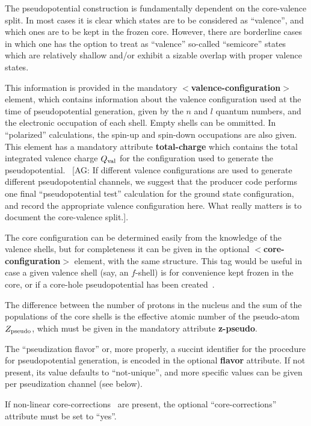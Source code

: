 \documentclass[prb,showpacs,superscriptaddress]{revtex4-1}
\def\tag#1{\textbf{$<$#1$>$}}
\def\att#1{\textbf{#1}}
\newcommand{\AG}[1]{{\color{red}~\textsf{[AG: #1]}}}
\begin{document}
The pseudopotential construction is fundamentally dependent on the
core-valence split. In most cases it is clear which states are to be
considered as ``valence'', and which ones are to be kept in the frozen
core. However, there are borderline cases in which one has the option
to treat as ``valence'' so-called ``semicore'' states which are
relatively shallow and/or exhibit a sizable overlap with proper
valence states.

This information is provided in the mandatory
\tag{valence-configuration} element, which contains information about
the valence configuration used at the time of pseudopotential
generation, given by the $n$ and $l$ quantum numbers, and the
electronic occupation of each shell.  Empty shells can be ommitted.
In ``polarized'' calculations, the spin-up and spin-down occupations
are also given.  This element has a mandatory attribute
\att{total-charge} which contains the total integrated valence
charge $Q_{\rm val}$ for the configuration used to generate the
pseudopotential.  \AG{If different valence configurations are used to
  generate different pseudopotential channels, we suggest that the
  producer code performs one final ``pseudopotential test''
  calculation for the ground state configuration, and record the
  appropriate valence configuration here. What really matters is to
  document the core-valence split.}.

The core configuration can be determined easily from the knowledge of
the valence shells, but for completeness it can be given in the
optional \tag{core-configuration} element, with the same structure.
This tag would be useful in case a given valence shell (say, an
$f$-shell) is for convenience kept frozen in the core, or if a core-hole
pseudopotential has been created~\cite{Sandra-cls-paper}.

The difference between the number of protons in the nucleus and the
sum of the populations of the core shells is the effective atomic
number of the pseudo-atom $Z_{\rm pseudo}$, which must be given in the
mandatory attribute \att{z-pseudo}.

The ``pseudization flavor'' or, more properly, a succint identifier
for the procedure for pseudopotential generation, is encoded in the
optional \att{flavor} attribute. If not present, its value defaults
to ``not-unique'', and more specific values can be given per
pseudization channel (see below).

If non-linear core-corrections~\cite{Louie-82} are present, the
optional ``core-corrections'' attribute must be set to ``yes''.
\end{document}
